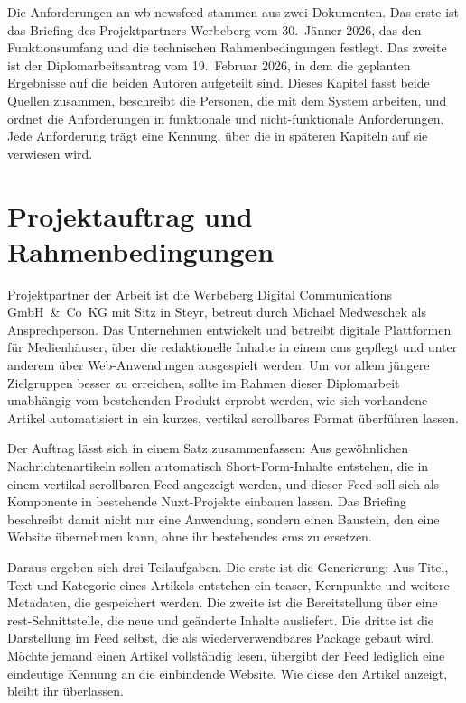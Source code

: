 Die Anforderungen an wb-newsfeed stammen aus zwei Dokumenten.\kihinweis{}
Das erste ist das Briefing des Projektpartners Werbeberg vom 30.~Jänner 2026, das den Funktionsumfang und die technischen Rahmenbedingungen festlegt.
Das zweite ist der Diplomarbeitsantrag vom 19.~Februar 2026, in dem die geplanten Ergebnisse auf die beiden Autoren aufgeteilt sind.
Dieses Kapitel fasst beide Quellen zusammen, beschreibt die Personen, die mit dem System arbeiten, und ordnet die Anforderungen in funktionale und nicht-funktionale Anforderungen.
Jede Anforderung trägt eine Kennung, über die in späteren Kapiteln auf sie verwiesen wird.

\section{Projektauftrag und Rahmenbedingungen}
\setauthor{\firstauthor}

Projektpartner der Arbeit ist die Werbeberg Digital Communications GmbH~\&~Co~KG mit Sitz in Steyr, betreut durch Michael Medweschek als Ansprechperson.
Das Unternehmen entwickelt und betreibt digitale Plattformen für Medienhäuser, über die redaktionelle Inhalte in einem \gls{cms} gepflegt und unter anderem über Web-Anwendungen ausgespielt werden.
Um vor allem jüngere Zielgruppen besser zu erreichen, sollte im Rahmen dieser Diplomarbeit unabhängig vom bestehenden Produkt erprobt werden, wie sich vorhandene Artikel automatisiert in ein kurzes, vertikal scrollbares Format überführen lassen.

Der Auftrag lässt sich in einem Satz zusammenfassen: Aus gewöhnlichen Nachrichtenartikeln sollen automatisch Short-Form-Inhalte entstehen, die in einem vertikal scrollbaren Feed angezeigt werden, und dieser Feed soll sich als Komponente in bestehende Nuxt-Projekte einbauen lassen.
Das Briefing beschreibt damit nicht nur eine Anwendung, sondern einen Baustein, den eine Website übernehmen kann, ohne ihr bestehendes \gls{cms} zu ersetzen.

Daraus ergeben sich drei Teilaufgaben.
Die erste ist die Generierung: Aus Titel, Text und Kategorie eines Artikels entstehen ein \gls{teaser}, Kernpunkte und weitere Metadaten, die gespeichert werden.
Die zweite ist die Bereitstellung über eine \gls{rest}-Schnittstelle, die neue und geänderte Inhalte ausliefert.
Die dritte ist die Darstellung im Feed selbst, die als wiederverwendbares Package gebaut wird.
Möchte jemand einen Artikel vollständig lesen, übergibt der Feed lediglich eine eindeutige Kennung an die einbindende Website.
Wie diese den Artikel anzeigt, bleibt ihr überlassen.


